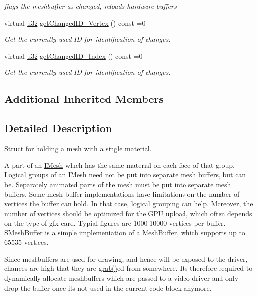 \begin{DoxyCompactItemize}
\begin{DoxyCompactList}\small\item\em flags the meshbuffer as changed, reloads hardware buffers \end{DoxyCompactList}\item 
virtual \hyperlink{namespaceirr_a0416a53257075833e7002efd0a18e804}{u32} \hyperlink{classirr_1_1scene_1_1IMeshBuffer_aba48df31edf92a0117692c0be02298db}{get\+Changed\+I\+D\+\_\+\+Vertex} () const =0
\begin{DoxyCompactList}\small\item\em Get the currently used ID for identification of changes. \end{DoxyCompactList}\item 
virtual \hyperlink{namespaceirr_a0416a53257075833e7002efd0a18e804}{u32} \hyperlink{classirr_1_1scene_1_1IMeshBuffer_acc389d76856dfb06c3ba45a92315e6d8}{get\+Changed\+I\+D\+\_\+\+Index} () const =0
\begin{DoxyCompactList}\small\item\em Get the currently used ID for identification of changes. \end{DoxyCompactList}\end{DoxyCompactItemize}
\subsection*{Additional Inherited Members}


\subsection{Detailed Description}
Struct for holding a mesh with a single material. 

A part of an \hyperlink{classirr_1_1scene_1_1IMesh}{I\+Mesh} which has the same material on each face of that group. Logical groups of an \hyperlink{classirr_1_1scene_1_1IMesh}{I\+Mesh} need not be put into separate mesh buffers, but can be. Separately animated parts of the mesh must be put into separate mesh buffers. Some mesh buffer implementations have limitations on the number of vertices the buffer can hold. In that case, logical grouping can help. Moreover, the number of vertices should be optimized for the G\+PU upload, which often depends on the type of gfx card. Typial figures are 1000-\/10000 vertices per buffer. S\+Mesh\+Buffer is a simple implementation of a Mesh\+Buffer, which supports up to 65535 vertices.

Since meshbuffers are used for drawing, and hence will be exposed to the driver, chances are high that they are \hyperlink{classirr_1_1IReferenceCounted_a396f9cdbe311ada278626477b3c6f0f5}{grab()}\textquotesingle{}ed from somewhere. It\textquotesingle{}s therefore required to dynamically allocate meshbuffers which are passed to a video driver and only drop the buffer once it\textquotesingle{}s not used in the current code block anymore. 

